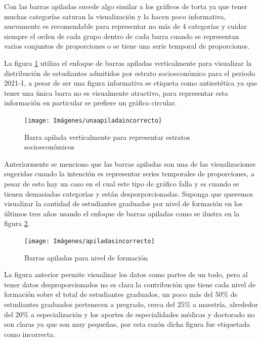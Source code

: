 \documentclass[
]{book}
\begin{document}
Con las barras apiladas sucede algo similar a los gráficos de torta ya que tener muchas categorías saturan la visualización y la hacen poco informativa, nuevamente es recomendable para representar no más de 4 categorías y cuidar siempre el orden de cada grupo dentro de cada barra cuando se representan varios conjuntos de proporciones o se tiene una serie temporal de proporciones.

La figura \ref{fig:apiladaantiestetica-fig} utiliza el enfoque de barras apiladas verticalmente para visualizar la distribución de estudiantes admitidos por estrato socioeconómico para el periodo 2021-1, a pesar de ser una figura informativa se etiqueta como antiestética ya que tener una única barra no es visualmente atractivo, para representar esta información en particular se prefiere un gráfico circular.

\begin{figure}

{\centering \texttt{[image: Imágenes/unaapiladaincorrecto]} 

}

\caption{Barra apilada verticalmente para representar estratos socioeconómicos}\label{fig:apiladaantiestetica-fig}
\end{figure}

Anteriormente se menciono que las barras apiladas son una de las visualizaciones sugeridas cuando la intención es representar series temporales de proporciones, a pesar de esto hay un caso en el cual este tipo de gráfico falla y es cuando se tienen demasiadas categorías y están desporporcionadas. Suponga que queremos visualizar la cantidad de estudiantes graduados por nivel de formación en los últimos tres años usando el enfoque de barras apiladas como se ilustra en la figura \ref{fig:apiladasincorrecto-fig}.

\begin{figure}

{\centering \texttt{[image: Imágenes/apiladasincorrecto]} 

}

\caption{Barras apiladas para nivel de formación}\label{fig:apiladasincorrecto-fig}
\end{figure}

La figura anterior permite visualizar los datos como partes de un todo, pero al tener datos desproporcionados no es clara la contribución que tiene cada nivel de formación sobre el total de estudiantes graduados, un poco más del \(50\%\) de estudiantes graduados pertenecen a pregrado, cerca del \(25\%\) a maestría, alrededor del \(20\%\) a especialización y los aportes de especialidades médicas y doctorado no son claras ya que son muy pequeñas, por esta razón dicha figura fue etiquetada como incorrecta.
\end{document}
